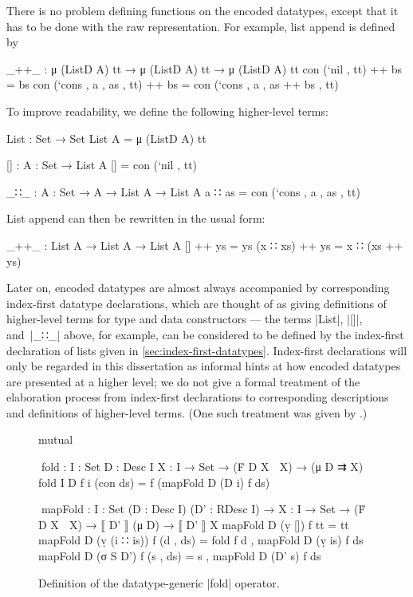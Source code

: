 
There is no problem defining functions on the encoded datatypes, except that it has to be done with the raw representation.
For example, list append is defined by
\begin{code}
_++_ : μ (ListD A) tt → μ (ListD A) tt → μ (ListD A) tt
con (`nil   ,           tt) ++ bs = bs
con (`cons  , a , as ,  tt) ++ bs = con (`cons , a , as ++ bs , tt)
\end{code}
To improve readability, we define the following higher-level terms:
\begin{code}
List : Set → Set
List A = μ (ListD A) tt

[] : {A : Set} → List A
[] = con (`nil , tt)

_∷_ : {A : Set} → A → List A → List A
a ∷ as = con (`cons  , a , as ,  tt)
\end{code}
List append can then be rewritten in the usual form:
\begin{code}
_++_ : List A → List A → List A
[]        ++ ys = ys
(x ∷ xs)  ++ ys = x ∷ (xs ++ ys)
\end{code}
Later on, encoded datatypes are almost always accompanied by corresponding index-first datatype declarations, which are thought of as giving definitions of higher-level terms for type and data constructors --- the terms |List|, |[]|, and~|_∷_| above, for example, can be considered to be defined by the index-first declaration of lists given in \autoref{sec:index-first-datatypes}.
Index-first declarations will only be regarded in this dissertation as informal hints at how encoded datatypes are presented at a higher level; we do not give a formal treatment of the elaboration process from index-first declarations to corresponding descriptions and definitions of higher-level terms.
(One such treatment was given by \citet{Dagand-elaboration}.)

\begin{figure}
\codefigure
\begin{code}
mutual

  ^^^fold : {I : Set} {D : Desc I} {X : I → Set} → (Ḟ D X ⇉ X) → (μ D ⇉ X)
  fold {I} {D} f {i} (con ds) = f (mapFold D (D i) f ds)

  ^^^mapFold :  {I : Set} (D : Desc I) (D' : RDesc I) →
                {X : I → Set} → (Ḟ D X ⇉ X) → ⟦ D' ⟧ (μ D) → ⟦ D' ⟧ X
  mapFold D (ṿ [])        f tt         = tt
  mapFold D (ṿ (i ∷ is))  f (d  , ds)  = fold f d , mapFold D (ṿ is) f ds
  mapFold D (σ S D')      f (s  , ds)  = s , mapFold D (D' s) f ds
\end{code}
\caption{Definition of the datatype-generic |fold| operator.}
\label{fig:fold}
\end{figure}

